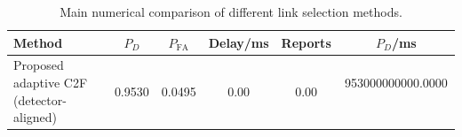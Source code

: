 \begin{table}[t]
    \centering
    \caption{Main numerical comparison of different link selection methods.}
    \label{tab:main_summary}
    \begin{tabular}{l c c c c c}
        \hline
        Method & $P_D$ & $P_{\mathrm{FA}}$ & Delay/ms & Reports & $P_D$/ms \\
        \hline
        Proposed adaptive C2F (detector-aligned) & 0.9530 & 0.0495 & 0.00 & 0.00 & 953000000000.0000 \
        \hline
    \end{tabular}
\end{table}
